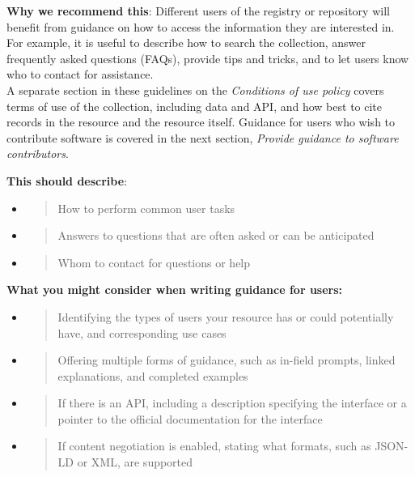 \documentclass[]{article}
\begin{document}
\textbf{Why we recommend this}: Different users of the registry or
repository will benefit from guidance on how to access the information
they are interested in. For example, it is useful to describe how to
search the collection, answer frequently asked questions (FAQs), provide
tips and tricks, and to let users know who to contact for
assistance.\\[2\baselineskip]A separate section in these guidelines on
the \emph{Conditions of use policy} covers terms of use of the
collection, including data and API, and how best to cite records in the
resource and the resource itself. Guidance for users who wish to
contribute software is covered in the next section, \emph{Provide
guidance to software contributors}.

\textbf{This should describe}:

\begin{itemize}
\item
  \begin{quote}
  How to perform common user tasks
  \end{quote}
\item
  \begin{quote}
  Answers to questions that are often asked or can be anticipated
  \end{quote}
\item
  \begin{quote}
  Whom to contact for questions or help
  \end{quote}
\end{itemize}

\textbf{What you might consider when writing guidance for users:}

\begin{itemize}
\item
  \begin{quote}
  Identifying the types of users your resource has or could potentially
  have, and corresponding use cases
  \end{quote}
\item
  \begin{quote}
  Offering multiple forms of guidance, such as in-field prompts, linked
  explanations, and completed examples
  \end{quote}
\item
  \begin{quote}
  If there is an API, including a description specifying the interface
  or a pointer to the official documentation for the interface
  \end{quote}
\item
  \begin{quote}
  If content negotiation is enabled, stating what formats, such as
  JSON-LD or XML, are supported
  \end{quote}
\end{itemize}
\end{document}
